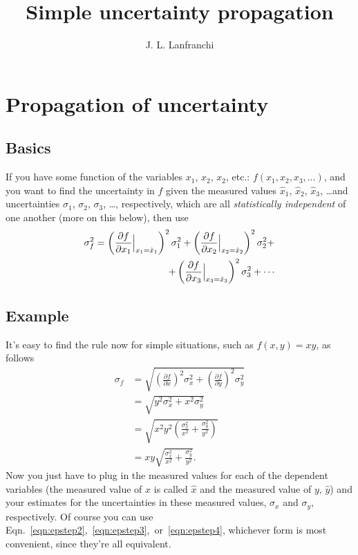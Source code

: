 \documentclass[10pt,letterpaper,twoside]{article}
\author{J. L. Lanfranchi}
\title{Simple uncertainty propagation}
\begin{document}
 
\twocolumn
\maketitle

\section{Propagation of uncertainty}
\subsection{Basics}
If you have some function of the variables $x_1$, $x_2$, $x_2$, etc.: $f(x_1,x_2,x_3,\dots)$, and you want to find the uncertainty in $f$ given the measured values $\hat x_{1}$, $\hat x_{2}$, $\hat x_{3}$, \dots and uncertainties $\sigma_{1}$, $\sigma_{2}$, $\sigma_{3}$, \dots, respectively, which are all \textit{statistically independent} of one another (more on this below), then use
\begin{align}
  \sigma_f^2 = \left(\frac{\partial f}{\partial x_1}\Big|_{x_1=\hat x_1}\right)^2\sigma_1^2 +
  \left(\frac{\partial f}{\partial x_2}\Big|_{x_2=\hat x_2}\right)^2\sigma_2^2 + \label{eqn:errorprop}\\
   + \left(\frac{\partial f}{\partial x_3}\Big|_{x_3=\hat x_3}\right)^2\sigma_3^2 + \cdots \notag
\end{align}
\subsection{Example}
It's easy to find the rule now for simple situations, such as $f(x,y)=x y$, as follows
\begin{align}
  \sigma_f &= \sqrt{\left(\frac{\partial f}{\partial x}\right)^2\sigma_x^2 +
  \left(\frac{\partial f}{\partial y}\right)^2\sigma_y^2 } \label{eqn:epstep1} \\
   &= \sqrt{y^2\sigma_x^2 + x^2\sigma_y^2 } \label{eqn:epstep2} \\
   &= \sqrt{x^2y^2\left( \frac{\sigma_x^2}{x^2} + \frac{\sigma_y^2}{y^2}\right) } \label{eqn:epstep3} \\
   &= xy \sqrt{ \frac{\sigma_x^2}{x^2} + \frac{\sigma_y^2}{y^2} }. \label{eqn:epstep4}
\end{align}
Now you just have to plug in the measured values for each of the dependent variables (the measured value of $x$ is called $\hat x$ and the measured value of $y$, $\hat y$) and your estimates for the uncertainties in these measured values, $\sigma_x$ and $\sigma_y$, respectively.
Of course you can use Eqn.~\ref{eqn:epstep2},~\ref{eqn:epstep3},~or~\ref{eqn:epstep4}, whichever form is most convenient, since they're all equivalent.
\end{document}
